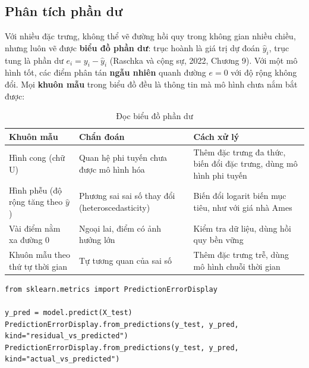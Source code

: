 \subsection{Phân tích phần dư}

Với nhiều đặc trưng, không thể vẽ đường hồi quy trong không gian nhiều chiều, nhưng luôn vẽ được \textbf{biểu đồ phần dư}: trục hoành là giá trị dự đoán $\hat{y}_i$, trục tung là phần dư $e_i = y_i - \hat{y}_i$ (Raschka và cộng sự, 2022, Chương 9). Với một mô hình tốt, các điểm phân tán \textbf{ngẫu nhiên} quanh đường $e = 0$ với độ rộng không đổi. Mọi \textbf{khuôn mẫu} trong biểu đồ đều là thông tin mà mô hình chưa nắm bắt được:

\begin{table}[H]
\centering
\begin{tabular}{|p{3.6cm}|p{4.2cm}|p{5cm}|}
\hline
\textbf{Khuôn mẫu} & \textbf{Chẩn đoán} & \textbf{Cách xử lý} \\
\hline
Hình cong (chữ U) & Quan hệ phi tuyến chưa được mô hình hóa & Thêm đặc trưng đa thức, biến đổi đặc trưng, dùng mô hình phi tuyến \\ \hline
Hình phễu (độ rộng tăng theo $\hat{y}$) & Phương sai sai số thay đổi (heteroscedasticity) & Biến đổi logarit biến mục tiêu, như với giá nhà Ames \\ \hline
Vài điểm nằm xa đường 0 & Ngoại lai, điểm có ảnh hưởng lớn & Kiểm tra dữ liệu, dùng hồi quy bền vững \\ \hline
Khuôn mẫu theo thứ tự thời gian & Tự tương quan của sai số & Thêm đặc trưng trễ, dùng mô hình chuỗi thời gian \\ \hline
\end{tabular}
\caption{Đọc biểu đồ phần dư}
\label{tab:residual-patterns}
\end{table}


\begin{lstlisting}[caption={Vẽ biểu đồ phần dư bằng scikit-learn}]
from sklearn.metrics import PredictionErrorDisplay

y_pred = model.predict(X_test)
PredictionErrorDisplay.from_predictions(y_test, y_pred, kind="residual_vs_predicted")
PredictionErrorDisplay.from_predictions(y_test, y_pred, kind="actual_vs_predicted")
\end{lstlisting}


